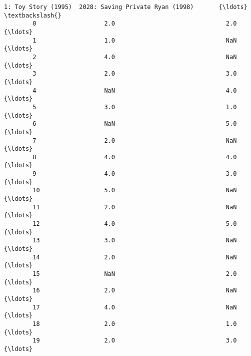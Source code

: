 \documentclass[11pt]{article}
\begin{document}
\begin{Verbatim}[commandchars=\\\{\}]
            1: Toy Story (1995)  2028: Saving Private Ryan (1998)       {\ldots}         \textbackslash{}
        0                   2.0                               2.0       {\ldots}          
        1                   1.0                               NaN       {\ldots}          
        2                   4.0                               NaN       {\ldots}          
        3                   2.0                               3.0       {\ldots}          
        4                   NaN                               4.0       {\ldots}          
        5                   3.0                               1.0       {\ldots}          
        6                   NaN                               5.0       {\ldots}          
        7                   2.0                               NaN       {\ldots}          
        8                   4.0                               4.0       {\ldots}          
        9                   4.0                               3.0       {\ldots}          
        10                  5.0                               NaN       {\ldots}          
        11                  2.0                               NaN       {\ldots}          
        12                  4.0                               5.0       {\ldots}          
        13                  3.0                               NaN       {\ldots}          
        14                  2.0                               NaN       {\ldots}          
        15                  NaN                               2.0       {\ldots}          
        16                  2.0                               NaN       {\ldots}          
        17                  4.0                               NaN       {\ldots}          
        18                  2.0                               1.0       {\ldots}          
        19                  2.0                               3.0       {\ldots}          
        

\end{Verbatim}
\end{document}
